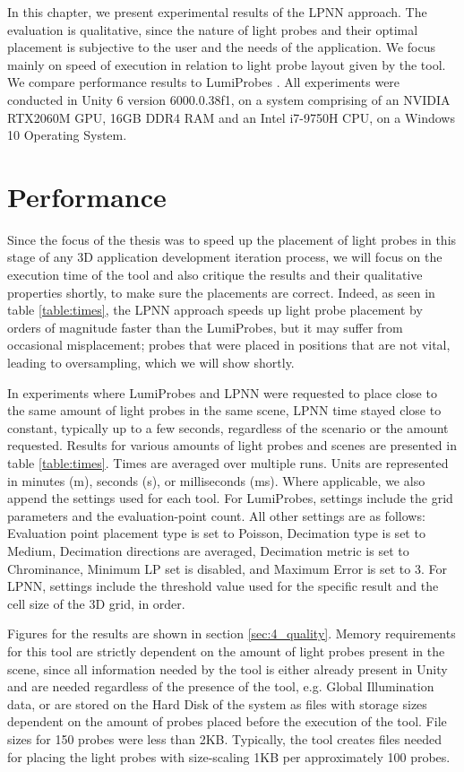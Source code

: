 In this chapter, we present experimental results of the LPNN approach. The evaluation is qualitative, since the nature of light probes and their optimal placement is subjective to the user and the needs of the application. We focus mainly on speed of execution in relation to light probe layout given by the tool. We compare performance results to LumiProbes \parencite{Vardis2021}. All experiments were conducted in Unity 6 version 6000.0.38f1, on a system comprising of an NVIDIA RTX2060M GPU, 16GB DDR4 RAM and an Intel i7-9750H CPU, on a Windows 10 Operating System.

\section{Performance}
\label{sec:4_performance}
Since the focus of the thesis was to speed up the placement of light probes in this stage of any 3D application development iteration process, we will focus on the execution time of the tool and also critique the results and their qualitative properties shortly, to make sure the placements are correct. Indeed, as seen in table \ref{table:times}, the LPNN approach speeds up light probe placement by orders of magnitude faster than the LumiProbes, but it may suffer from occasional misplacement; probes that were placed in positions that are not vital, leading to oversampling, which we will show shortly. 

In experiments where LumiProbes and LPNN were requested to place close to the same amount of light probes in the same scene, LPNN time stayed close to constant, typically up to a few seconds, regardless of the scenario or the amount requested. Results for various amounts of light probes and scenes are presented in table \ref{table:times}. Times are averaged over multiple runs. Units are represented in minutes (m), seconds (s), or milliseconds (ms). Where applicable, we also append the settings used for each tool. For LumiProbes, settings include the grid parameters and the evaluation-point count. All other settings are as follows: Evaluation point placement type is set to Poisson, Decimation type is set to Medium, Decimation directions are averaged, Decimation metric is set to  Chrominance, Minimum LP set is disabled, and Maximum Error is set to 3. For LPNN, settings include the threshold value used for the specific result and the cell size of the 3D grid, in order. 

Figures for the results are shown in section \ref{sec:4_quality}. Memory requirements for this tool are strictly dependent on the amount of light probes present in the scene, since all information needed by the tool is either already present in Unity and are needed regardless of the presence of the tool, e.g. Global Illumination data, or are stored on the Hard Disk of the system as files with storage sizes dependent on the amount of probes placed before the execution of the tool. File sizes for 150 probes were less than 2KB. Typically, the tool creates files needed for placing the light probes with size-scaling 1KB per approximately 100 probes.

